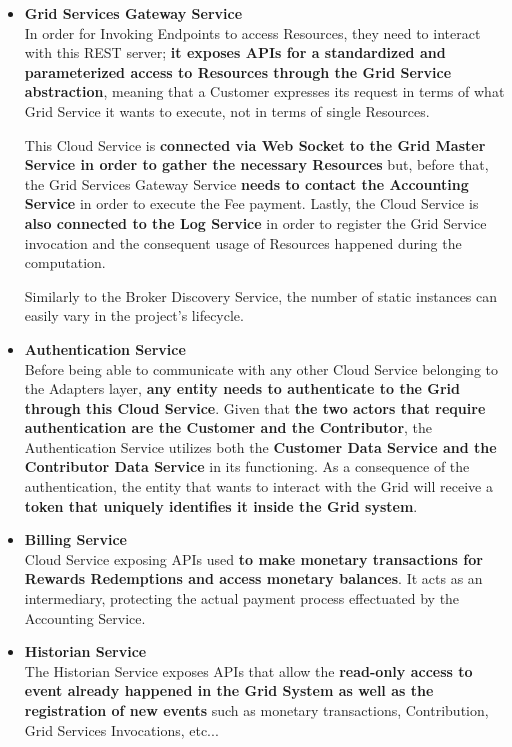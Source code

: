 \begin{itemize}
    \item \textbf{Grid Services Gateway Service}\\
    In order for Invoking Endpoints to access Resources, they need to interact with this REST server; \textbf{it exposes APIs for a standardized and parameterized access to Resources through the Grid Service abstraction}, meaning that a Customer expresses its request in terms of what Grid Service it wants to execute, not in terms of single Resources.
    
    This Cloud Service is \textbf{connected via Web Socket to the Grid Master Service in order to gather the necessary Resources} but, before that, the Grid Services Gateway Service \textbf{needs to contact the Accounting Service} in order to execute the Fee payment. Lastly, the Cloud Service is \textbf{also connected to the Log Service} in order to register the Grid Service invocation and the consequent usage of Resources happened during the computation.

    Similarly to the Broker Discovery Service, the number of static instances can easily vary in the project's lifecycle. 

    \item \textbf{Authentication Service}\\
    Before being able to communicate with any other Cloud Service belonging to the Adapters layer, \textbf{any entity needs to authenticate to the Grid through this Cloud Service}. Given that \textbf{the two actors that require authentication are the Customer and the Contributor}, the Authentication Service utilizes both the \textbf{Customer Data Service and the Contributor Data Service} in its functioning. As a consequence of the authentication, the entity that wants to interact with the Grid will receive a \textbf{token that uniquely identifies it inside the Grid system}.

    \item \textbf{Billing Service}\\
    Cloud Service exposing APIs used \textbf{to make monetary transactions for Rewards Redemptions and access monetary balances}. It acts as an intermediary, protecting the actual payment process effectuated by the Accounting Service.

    \item \textbf{Historian Service}\\
    The Historian Service exposes APIs that allow the \textbf{read-only access to event already happened in the Grid System as well as the registration of new events} such as monetary transactions, Contribution, Grid Services Invocations, etc...

\end{itemize}
\vspace{20mm}

